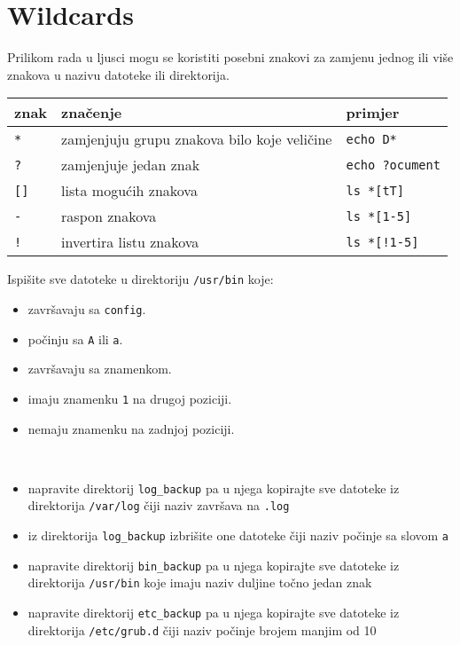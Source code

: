 \section{Wildcards}

Prilikom rada u ljusci mogu se koristiti posebni znakovi za zamjenu jednog ili više znakova u nazivu datoteke ili direktorija.

\begin{center}
\begin{tabular}{lll}
\toprule
znak & značenje & primjer\\


\midrule
\texttt{*} & zamjenjuju grupu znakova bilo koje veličine& \texttt{echo D*}\\
\texttt{?} & zamjenjuje jedan znak&\texttt{echo ?ocument}\\
\texttt{[]} & lista mogućih znakova&\texttt{ls *[tT]}\\ 
\texttt{-} & raspon znakova &\texttt{ls *[1-5]}\\
\texttt{!} &invertira listu znakova&\texttt{ls *[!1-5]}\\
\bottomrule
\end{tabular}
\end{center}
\begin{zadatak} Ispišite sve datoteke u direktoriju \texttt{/usr/bin} koje:
\begin{itemize}
 \item završavaju sa \texttt{config}.
 \item počinju sa \texttt{A} ili \texttt{a}.
 \item završavaju sa znamenkom.
 \item imaju znamenku \texttt{1} na drugoj poziciji.
 \item nemaju znamenku na zadnjoj poziciji.
 \end{itemize}
\end{zadatak}

\begin{zadatak} \
	\begin{itemize}
		
		\item napravite direktorij \texttt{log\_backup} pa u njega kopirajte sve datoteke iz direktorija \texttt{/var/log} čiji naziv završava na \texttt{.log}
		
		\item iz direktorija \texttt{log\_backup} izbrišite one datoteke čiji naziv počinje sa slovom \texttt{a}
		
		\item napravite direktorij \texttt{bin\_backup} pa u njega kopirajte sve datoteke iz direktorija \texttt{/usr/bin} koje imaju naziv duljine točno jedan znak
		
		\item napravite direktorij \texttt{etc\_backup} pa u njega kopirajte sve datoteke iz direktorija \texttt{/etc/grub.d} čiji naziv počinje brojem manjim od 10
	\end{itemize}
	
\end{zadatak}



